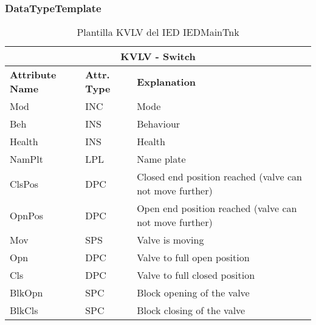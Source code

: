     \subsubsection{DataTypeTemplate}
    \begin{table}[H]
    \begin{center}
    \begin{tabular}{|l|l|p{8.5cm}|}
            \hline
            \multicolumn{3}{|c|}{\cellcolor[gray]{0.8} \textbf{ KVLV}  - Switch} \\
            \hline
            \textbf{Attribute Name} & \textbf{Attr. Type} & \textbf{Explanation} \\
            \hline 
            Mod & INC & Mode \\
            \hline
            Beh & INS & Behaviour \\
            \hline
            Health & INS & Health \\
            \hline
            NamPlt & LPL & Name plate \\
            \hline
            ClsPos & DPC & Closed end position reached (valve can not move further) \\
            \hline
            OpnPos & DPC & Open end position reached (valve can not move further) \\
            \hline
            Mov & SPS & Valve is moving \\
            \hline
            Opn & DPC & Valve to full open position \\
            \hline
            Cls & DPC & Valve to full closed position \\
            \hline
            BlkOpn & SPC & Block opening of the valve \\
            \hline
            BlkCls & SPC & Block closing of the valve \\
            \hline
    \end{tabular}
    \caption{Plantilla KVLV del IED IEDMainTnk}
    \label{table:lnTypeKVLV_switch}
    \end{center}
    \end{table}
    
    
    